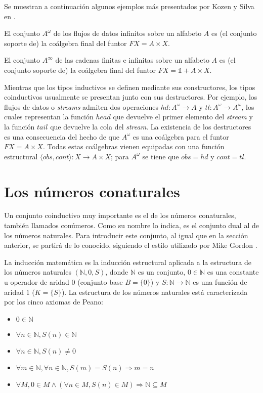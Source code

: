 Se muestran a continuación algunos ejemplos más presentados por Kozen y Silva en \cite{kozen:2017}.

\begin{ejemplo}
El conjunto $A^{\omega}$ de los flujos de datos infinitos sobre un alfabeto $A$ es (el conjunto soporte de) la coálgebra final del funtor $\mathit{F}X = A \times X$.
\end{ejemplo}

\begin{ejemplo}
El conjunto $A^{\infty}$ de las cadenas finitas e infinitas sobre un alfabeto $A$ es (el conjunto soporte de) la coálgebra final del funtor $\mathit{F}X = \mathds{1} + A \times X$.
\end{ejemplo}

Mientras que los tipos inductivos se definen mediante sus constructores, los tipos coinductivos usualmente se presentan junto con sus destructores. Por ejemplo, los flujos de datos o \textit{streams} admiten dos operaciones $hd: A^{\omega} \rightarrow A$ y $tl : A^{\omega} \rightarrow A^{\omega}$, los cuales representan la función $head$ que devuelve el primer elemento del \textit{stream} y la función $tail$ que devuelve la cola del \textit{stream}. La existencia de los destructores es una consecuencia del hecho de que $A^{\omega}$ es una coálgebra para el funtor $\mathit{F}X = A \times X$. Todas estas coálgebras vienen equipadas con una función estructural $\langle obs, cont \rangle  : X \rightarrow A \times X$; para $A^{\omega}$ se tiene que $obs = hd$ y $cont = tl$.

\section{Los números conaturales}\label{delay:conat}

Un conjunto coinductivo muy importante es el de los números conaturales, también llamados conúmeros. Como su nombre lo indica, es el conjunto dual al de los números naturales. Para introducir este conjunto, al igual que en la sección anterior, se partirá de lo conocido, siguiendo el estilo utilizado por Mike Gordon \cite{gordon:2017}.

La inducción matemática es la inducción estructural aplicada a la estructura de los números naturales $(\mathbb{N},0,S)$, donde $\mathbb{N}$ es un conjunto, $0 \in \mathbb{N}$ es una constante u operador de aridad $0$ (conjunto base $B = \{0\}$) y $S : \mathbb{N} \rightarrow \mathbb{N}$ es una función de aridad $1$ ($K = \{S\}$). La estructura de los números naturales está caracterizada por los cinco axiomas de Peano:
\begin{itemize}
\item $0 \in \mathbb{N}$
\item $\forall n \in \mathbb{N}, S(n) \in \mathbb{N}$
\item $\forall n \in \mathbb{N}, S(n) \neq 0$
\item $\forall m \in \mathbb{N}, \forall n \in \mathbb{N}, S(m) = S(n) \Rightarrow m = n$
\item $\forall M, 0 \in M \land (\forall n \in M, S(n) \in M) \Rightarrow \mathbb{N} \subseteq M$
\end{itemize}

